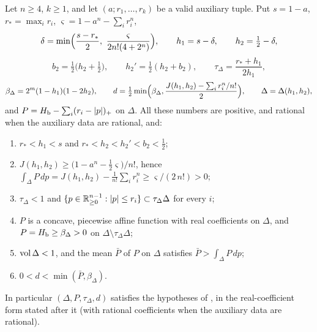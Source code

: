 \begin{lemma}\label{lem:two-parameters}
Let $n\ge4$, $k\ge1$, and let $(a;r_1,\dots,r_k)$ be a valid auxiliary tuple. Put $s=1-a$, $r_*=\max_ir_i$,
$\varsigma=1-a^n-\sum_ir_i^n$,
\[
 \delta=\min\Bigl(\frac{s-r_*}2,\ \frac{\varsigma}{2n!(4+2^n)}\Bigr),\qquad
 h_1=s-\delta,\qquad h_2=\tfrac12-\delta,
\]
\[
 b_2=\tfrac12\bigl(h_2+\tfrac12\bigr),\qquad h_2'=\tfrac12(h_2+b_2),\qquad
 \tau_\Delta=\frac{r_*+h_1}{2h_1},
\]
\[
 \beta_\Delta=2^m(1-h_1)(1-2h_2),\qquad
 d=\tfrac12\min\Bigl(\beta_\Delta,\frac{J(h_1,h_2)-\sum_i r_i^n/n!}{2}\Bigr),\qquad \Delta=\Delta(h_1,h_2),
\]
and $P=H_{\mathrm b}-\sum_i(r_i-|p|)_+$ on $\Delta$. All these numbers are positive, and rational when the auxiliary data are rational, and:
\begin{enumerate}[label=(\roman*)]
\item $r_*<h_1<s$ and $r_*<h_2<h_2'<b_2<\frac12$;
\item $J(h_1,h_2)\ge\bigl(1-a^n-\frac12\varsigma\bigr)/n!$, hence $\int_\Delta P\,dp=J(h_1,h_2)-\frac1{n!}\sum_ir_i^n\ge\varsigma/(2\,n!)>0$;
\item $\tau_\Delta<1$ and $\{p\in\mathbb{R}^{n-1}_{\ge0}:|p|\le r_i\}\subset\tau_\Delta\Delta$ for every $i$;
\item $P$ is a concave, piecewise affine function with real coefficients on $\Delta$, and $P=H_{\mathrm b}\ge\beta_\Delta>0$ on $\Delta\setminus\tau_\Delta\Delta$;
\item $\operatorname{vol}\Delta<1$, and the mean $\bar P$ of $P$ on $\Delta$ satisfies $\bar P>\int_\Delta P\,dp$;
\item $0<d<\min(\bar P,\beta_\Delta)$.
\end{enumerate}
In particular $(\Delta,P,\tau_\Delta,d)$ satisfies the hypotheses of , in the
real-coefficient form stated after it (with rational coefficients when the auxiliary data are rational).
\end{lemma}

